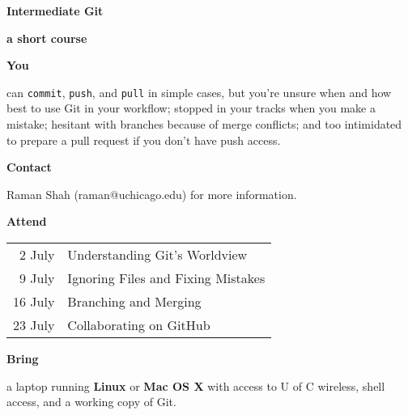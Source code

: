 \documentclass{article}
\begin{document}
\centerline{\fontsize{72}{108} \sffamily \textbf{Intermediate Git}}

\vspace*{18 pt}

\centerline{\fontsize{36}{54} \sffamily \textbf{a short course}}

\vspace*{36 pt}

\begin{minipage}[t]{0.45\textwidth}

{\fontsize{24}{36}\textbf{You}}
\raggedright

can \texttt{commit}, \texttt{push}, and \texttt{pull} in simple
cases, but you're
unsure when and how best to use Git in your workflow;
stopped in your tracks when you make a mistake;
hesitant with branches because of merge conflicts; and
too intimidated to prepare a pull request if you don't have push access.

\vspace*{18 pt}

{\fontsize{24}{36}\textbf{Contact}}
\raggedright

Raman Shah (raman@uchicago.edu) for more information.

\end{minipage}\qquad
\begin{minipage}[t]{0.45\textwidth}

{\fontsize{24}{36}\textbf{Attend}}
\raggedright

\vspace*{3 pt}

\begin{tabular}{r>{\raggedright\arraybackslash}p{}}
2 July & Understanding Git's Worldview\\
9 July & Ignoring Files and Fixing Mistakes\\
16 July & Branching and Merging\\
23 July & Collaborating on GitHub\\
\end{tabular}

\vspace*{18 pt}

{\fontsize{24}{36}\textbf{Bring}}
\raggedright

a laptop running \textbf{Linux} or \textbf{Mac OS X} with access to U
of C wireless, shell access, and a working copy of Git.

\end{minipage}

\vspace*{36 pt}
\end{document}
